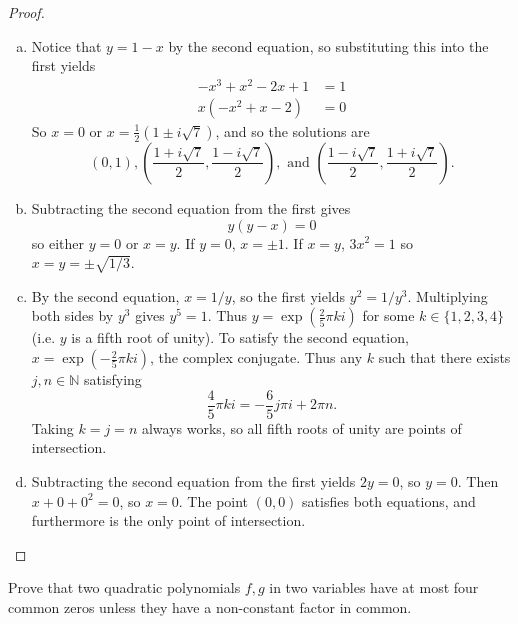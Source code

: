 \documentclass{article}
\newenvironment{problem}[2][Problem]{\begin{trivlist}
\item[\hskip \labelsep {\bfseries #1}\hskip \labelsep {\bfseries #2.}]}{\end{trivlist}}
\newcommand{\set}[1]{\{ #1 \}}
\newcommand{\paren}[1]{\left( #1 \right)}
\begin{document}
\begin{proof} ~
  \begin{enumerate}[(a)]
    \item Notice that $y = 1 - x$ by the second equation, so substituting this
    into the first yields \begin{align*}
      -x^3 + x^2 - 2x + 1 &= 1 \\
      x(-x^2 + x - 2) &= 0
    \end{align*}
    So $x = 0$ or $x = \frac 12 (1 \pm i\sqrt 7)$, and so the solutions are \[
      (0, 1),
      \paren{\frac{1 + i\sqrt 7}2, \frac{1 - i\sqrt 7}2}, \text{ and }
      \paren{\frac{1 - i\sqrt 7}2, \frac{1 + i\sqrt 7}2}.
    \]
    \item Subtracting the second equation from the first gives \[
      y(y - x) = 0
    \]  so either $y = 0$ or $x = y$.
    If $y = 0$, $x = \pm 1$.
    If $x = y$, $3x^2 = 1$ so $x = y = \pm\sqrt{1/3}$.
    \item By the second equation, $x = 1/y$, so the first yields $y^2 =  1/y^3$.
    Multiplying both sides by $y^3$ gives $y^5 = 1$. Thus $y = \exp(\frac25\pi k i)$
    for some $k \in \set{1,2,3,4}$ (i.e. $y$ is a fifth root of unity).
    To satisfy the second equation, $x = \exp(-\frac25\pi k i)$, the complex conjugate.
    Thus any $k$ such that there exists $j, n \in \mathbb N$ satisfying \[
      \frac 45\pi k i = -\frac 65 j \pi i + 2\pi n.
    \] Taking $k = j = n$ always works, so all fifth roots of unity are points of intersection.
    \item Subtracting the second equation from the first yields $2y = 0$, so $y = 0$.
    Then $x + 0 + 0^2 = 0$, so $x = 0$. The point $(0,0)$ satisfies both
    equations, and furthermore is the only point of intersection.
  \end{enumerate}
\end{proof}
\pagebreak
\begin{problem}{9 (Artin)}
  Prove that two quadratic polynomials $f, g$ in two variables have at most four
  common zeros unless they have a non-constant factor in common.
\end{problem}
\end{document}
